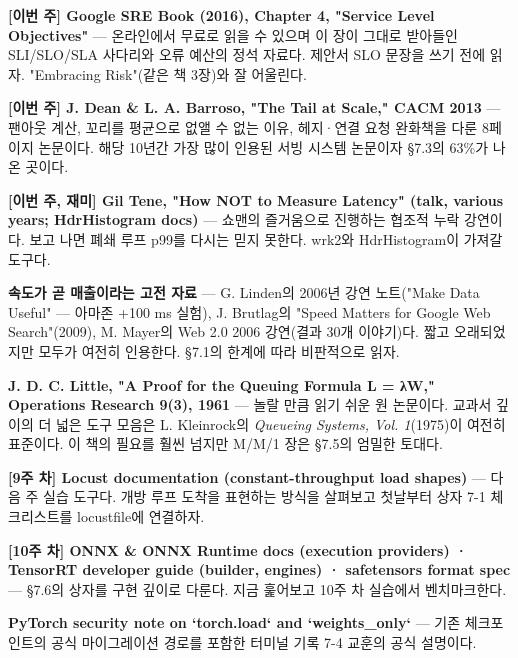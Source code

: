 \begin{tbbitemize}
  \item \textbf{[이번 주] Google SRE Book (2016), Chapter 4, "Service Level Objectives"} — 온라인에서 무료로 읽을 수 있으며 이 장이 그대로 받아들인 SLI/SLO/SLA 사다리와 오류 예산의 정석 자료다. 제안서 SLO 문장을 쓰기 전에 읽자. "Embracing Risk"(같은 책 3장)와 잘 어울린다.
  \item \textbf{[이번 주] J. Dean \& L. A. Barroso, "The Tail at Scale," CACM 2013} — 팬아웃 계산, 꼬리를 평균으로 없앨 수 없는 이유, 헤지·연결 요청 완화책을 다룬 8페이지 논문이다. 해당 10년간 가장 많이 인용된 서빙 시스템 논문이자 §7.3의 63\%가 나온 곳이다.
  \item \textbf{[이번 주, 재미] Gil Tene, "How NOT to Measure Latency" (talk, various years; HdrHistogram docs)} — 쇼맨의 즐거움으로 진행하는 협조적 누락 강연이다. 보고 나면 폐쇄 루프 p99를 다시는 믿지 못한다. wrk2와 HdrHistogram이 가져갈 도구다.
  \item \textbf{속도가 곧 매출이라는 고전 자료} — G. Linden의 2006년 강연 노트("Make Data Useful" — 아마존 +100 ms 실험), J. Brutlag의 "Speed Matters for Google Web Search"(2009), M. Mayer의 Web 2.0 2006 강연(결과 30개 이야기)다. 짧고 오래되었지만 모두가 여전히 인용한다. §7.1의 한계에 따라 비판적으로 읽자.
  \item \textbf{J. D. C. Little, "A Proof for the Queuing Formula L = λW," Operations Research 9(3), 1961} — 놀랄 만큼 읽기 쉬운 원 논문이다. 교과서 깊이의 더 넓은 도구 모음은 L. Kleinrock의 \textit{Queueing Systems, Vol. 1}(1975)이 여전히 표준이다. 이 책의 필요를 훨씬 넘지만 M/M/1 장은 §7.5의 엄밀한 토대다.
  \item \textbf{[9주 차] Locust documentation (constant-throughput load shapes)} — 다음 주 실습 도구다. 개방 루프 도착을 표현하는 방식을 살펴보고 첫날부터 상자 7-1 체크리스트를 locustfile에 연결하자.
  \item \textbf{[10주 차] ONNX \& ONNX Runtime docs (execution providers) · TensorRT developer guide (builder, engines) · safetensors format spec} — §7.6의 상자를 구현 깊이로 다룬다. 지금 훑어보고 10주 차 실습에서 벤치마크한다.
  \item \textbf{PyTorch security note on `torch.load` and `weights\_only`} — 기존 체크포인트의 공식 마이그레이션 경로를 포함한 터미널 기록 7-4 교훈의 공식 설명이다.
\end{tbbitemize}

\vspace{5.0pt}

